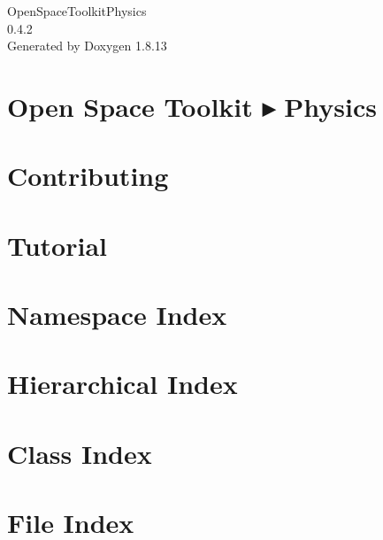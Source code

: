 \documentclass[twoside]{book}
\newcommand{\+}{\discretionary{\mbox{\scriptsize$\hookleftarrow$}}{}{}}
\newcommand{\clearemptydoublepage}{%
  \newpage{\pagestyle{empty}\cleardoublepage}%
}
\begin{document}
\hypersetup{pageanchor=false,
             bookmarksnumbered=true,
             pdfencoding=unicode
            }
\begin{titlepage}
\vspace*{7cm}
\begin{center}%
{\Large Open\+Space\+Toolkit\+Physics \\[1ex]\large 0.\+4.\+2 }\\
\vspace*{1cm}
{\large Generated by Doxygen 1.8.13}\\
\end{center}
\end{titlepage}
\clearemptydoublepage
{}
\tableofcontents
\clearemptydoublepage
{}
\hypersetup{pageanchor=true}

\chapter{Open Space Toolkit ▸ Physics}
\label{index}\hypertarget{index}{}
\chapter{Contributing}
\label{md__c_o_n_t_r_i_b_u_t_i_n_g}

\chapter{Tutorial}
\label{md_docs__tutorial}

\chapter{Namespace Index}

\chapter{Hierarchical Index}

\chapter{Class Index}

\chapter{File Index}

\end{document}
